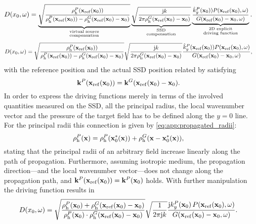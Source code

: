 \begin{equation}
D(x_0,\omega) =
\footnotesize
\underbrace{\sqrt{\frac{\rho_\mathrm{h}^P(\mathbf{x}_{\mathrm{ref}}(\mathbf{x}_0))}{\rho_\mathrm{h}^P(\mathbf{x}_{\mathrm{ref}}(\mathbf{x}_0))-\rho_\mathrm{h}^G(\mathbf{x}_{\mathrm{ref}}(\mathbf{x}_0)-\mathbf{x}_0) }}}_{{\substack{\text{virtual source}\\\text{compensation}}}}
\underbrace{ \sqrt{\frac{\mathrm{j} k}{2\pi \rho_\mathrm{h}^G(\mathbf{x}_{\mathrm{ref}}(\mathbf{x}_0)-\mathbf{x}_0)}} }_{{\substack{\text{SSD}\\\text{compensation}}}} 
\underbrace{\frac{\hat{k}_y^{P}(\mathbf{x}_0))P(\mathbf{x}_{\mathrm{ref}}(\mathbf{x}_0),\omega)}{G(\mathbf{x}_{\mathrm{ref}}(\mathbf{x}_0)-\mathbf{x}_0,\omega)}}_{\substack{\text{2D explicit}\\\text{driving function}}}.
\end{equation}
\begin{equation}
\label{eq:SFS_theory:spatial_sdm_3}
D(x_0,\omega) =
\footnotesize
\sqrt{\frac{\rho_\mathrm{h}^P(\mathbf{x}_{\mathrm{ref}}(\mathbf{x}_0))}{\rho_\mathrm{h}^P(\mathbf{x}_{\mathrm{ref}}(\mathbf{x}_0))-\rho_\mathrm{h}^G(\mathbf{x}_{\mathrm{ref}}(\mathbf{x}_0)-\mathbf{x}_0) }}
\sqrt{\frac{\mathrm{j} k}{2\pi \rho_\mathrm{h}^G(\mathbf{x}_{\mathrm{ref}}(\mathbf{x}_0)-\mathbf{x}_0)}} 
\frac{\hat{k}_y^{P}(\mathbf{x}_{\mathrm{ref}}(\mathbf{x}_0))P(\mathbf{x}_{\mathrm{ref}}(\mathbf{x}_0),\omega)}{G(\mathbf{x}_{\mathrm{ref}}(\mathbf{x}_0)-\mathbf{x}_0,\omega)},
\end{equation}
with the reference position and the actual SSD position related by satisfying 
\begin{equation}
\label{Eq:stationary_evaluation_points}
\mathbf{k}^P(\mathbf{x}_{\mathrm{ref}}(\mathbf{x}_0)) = \mathbf{k}^G(\mathbf{x}_{\mathrm{ref}}(\mathbf{x}_0)-\mathbf{x}_0).
\end{equation}
In order to express the driving functions merely in terms of the involved quantities measured on the SSD, all the principal radius, the local wavenumber vector and the pressure of the target field has to be defined along the $y =0$ line.
For the principal radii this connection is given by \eqref{eq:app:propagated_radii}:
\begin{equation}
\label{Eq:principal_radii_addition}
\rho_\mathrm{h}^P(\mathbf{x})=  \rho_\mathrm{h}^P(\mathbf{x}_0^*(\mathbf{x})) + \rho_\mathrm{h}^G(\mathbf{x}-\mathbf{x}_0^*(\mathbf{x})),
\end{equation}
stating that the principal radii of an arbitrary field increase linearly along the path of propagation.
Furthermore, assuming isotropic medium, the propagation direction---and the local wavenumber vector---does not change along the propagation path, and $\mathbf{k}^P(\mathbf{x}_{\mathrm{ref}}(\mathbf{x}_0)) = \mathbf{k}^P(\mathbf{x}_0)$ holds.
With further manipulation the driving function results in
\begin{equation}
\label{eq:SFS_theory:spatial_sdm_3}
D(x_0,\omega) =
\small
\sqrt{\frac{\rho_\mathrm{h}^P(\mathbf{x}_0) + \rho_\mathrm{h}^G(\mathbf{x}_{\mathrm{ref}}(\mathbf{x}_0)-\mathbf{x}_0)}{\rho_\mathrm{h}^P(\mathbf{x}_0) \cdot \rho_\mathrm{h}^G(\mathbf{x}_{\mathrm{ref}}(\mathbf{x}_0)-\mathbf{x}_0) }}
\sqrt{\frac{1}{2\pi \mathrm{j} k}} 
\frac{\mathrm{j} k_y^{P}(\mathbf{x}_0) \, P(\mathbf{x}_{\mathrm{ref}}(\mathbf{x}_0),\omega)}{G(\mathbf{x}_{\mathrm{ref}}(\mathbf{x}_0)-\mathbf{x}_0,\omega)}.
\end{equation} %

